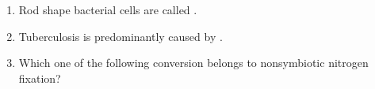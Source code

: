 \documentclass[journal]{IEEEtran}
\numberwithin{equation}{enumi}
\numberwithin{figure}{enumi}
\begin{document}
\begin{enumerate}[start=1, label={Q\arabic*.}]
\begin{enumerate} 
  \end{enumerate}
\item Rod shape bacterial cells are called \underline{\hspace{1.5cm}}.
\begin{enumerate} 
  \end{enumerate}
\item Tuberculosis is predominantly caused by \underline{\hspace{1.5cm}}.
\begin{enumerate} 
  \end{enumerate}
\item Which one of the following conversion belongs to nonsymbiotic nitrogen fixation?


\end{enumerate}
\end{document}
